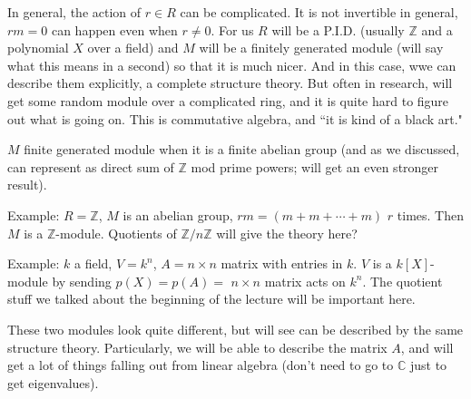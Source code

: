 \documentclass{article}
\theoremstyle{plain}
\theoremstyle{remark}
\newcommand{\Z}{{\mathbb Z}}
\newcommand{\C}{{\mathbb C}}
\begin{document}
In general, the action of $r \in R$ can be complicated.
It is not invertible in general, $rm = 0$ can happen even when $r \neq 0$.
For us $R$ will be a P.I.D. (usually $\Z$ and a polynomial $X$ over a field)
and $M$ will be a finitely generated module
(will say what this means in a second)
so that it is much nicer.
And in this case, wwe can describe them explicitly,
a complete structure theory.
But often in research, will get some random module over a complicated ring,
and it is quite hard to figure out what is going on.
This is commutative algebra, and ``it is kind of a black art."

$M$ finite generated module when it is a finite abelian group
(and as we discussed, can represent as direct sum of $\Z$ mod prime powers;
will get an even stronger result).

Example: $R = \Z$, $M$ is an abelian group,
$rm = (m + m + \cdots + m)$ $r$ times.
Then $M$ is a $\Z$-module.
Quotients of $\Z/n\Z$ will give the theory here?

Example: $k$ a field, $V = k^n$, $A = n \times n$ matrix with entries in $k$.
$V$ is a $k[X]$-module by sending $p(X) = p(A) = $
$n \times n$ matrix acts on $k^n$.
The quotient stuff we talked about the beginning of the lecture
will be important here.

These two modules look quite different,
but will see can be described by the same structure theory.
Particularly, we will be able to describe the matrix $A$,
and will get a lot of things falling out from linear algebra
(don't need to go to $\C$ just to get eigenvalues).
\end{document}
